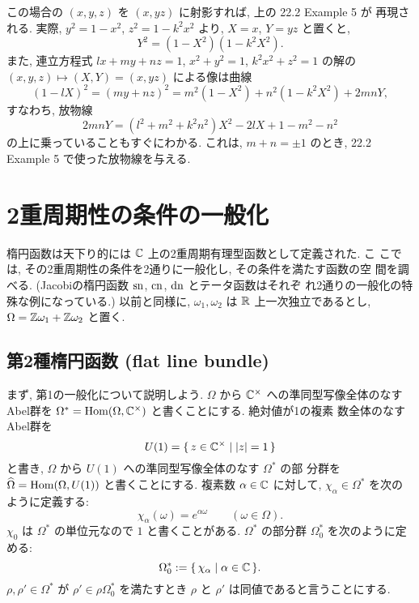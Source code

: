 \documentclass[12pt,twoside]{jarticle}
\def\sn{\mathop{\text{\rm sn}}\nolimits}
\def\cn{\mathop{\text{\rm cn}}\nolimits}
\def\dn{\mathop{\text{\rm dn}}\nolimits}
\def\Omegahat{\widehat\Omega}
\def\Hom{\mathop{\text{\rm Hom}}\nolimits}
\def\Z{{\Bbb Z}} %
\def\R{{\Bbb R}} %
\def\C{{\Bbb C}} %
\begin{document}
この場合の $(x,y,z)$ を $(x,yz)$ に射影すれば, 上の 22.2 Example 5 が
再現される.  実際, $y^2 = 1 - x^2$, $z^2 = 1 - k^2 x^2$ より, %
$X = x$, $Y = yz$ と置くと,
\[
  Y^2 = (1 - X^2)(1 - k^2 X^2).
\] %
また, 連立方程式 $l x + m y + n z = 1$, $x^2 + y^2 = 1$, %
$k^2 x^2 + z^2 = 1$ の解の $(x,y,z)\mapsto(X,Y)=(x,yz)$ による像は曲線
\[
  (1 - lX)^2 = (my + nz)^2 = m^2(1 - X^2) + n^2(1 - k^2 X^2) + 2mnY,
\]
すなわち, 放物線
\[
  2mnY = (l^2 + m^2 + k^2 n^2) X^2 - 2 l X + 1 - m^2 - n^2
\] %
の上に乗っていることもすぐにわかる. これは, $m + n = \pm1$ のとき, %
\cite{WW} 22.2 Example 5 で使った放物線を与える.


\section{2重周期性の条件の一般化}

楕円函数は天下り的には $\C$ 上の2重周期有理型函数として定義された. こ
こでは, その2重周期性の条件を2通りに一般化し, その条件を満たす函数の空
間を調べる. (Jacobiの楕円函数 $\sn$, $\cn$, $\dn$ とテータ函数はそれぞ
れ2通りの一般化の特殊な例になっている.)  
以前と同様に, $\omega_1,\omega_2$ は $\R$ 上一次独立であるとし, %
$\Omega=\Z\omega_1+\Z\omega_2$ と置く.


\subsection{第2種楕円函数 (flat line bundle)}

まず, 第1の一般化について説明しよう. %
$\Omega$ から $\C^{\times}$ への準同型写像全体のなすAbel群を %
$\Omega^*=\Hom(\Omega,\C^{\times})$ と書くことにする. 絶対値が1の複素
数全体のなすAbel群を
\[
  U(1)=\{\,z\in\C^{\times}\mid|z|=1\,\}
\] %
と書き, $\Omega$ から $U(1)$ への準同型写像全体のなす $\Omega^*$ の部
分群を $\Omegahat=\Hom(\Omega,U(1))$ と書くことにする. %
複素数 $\alpha\in\C$ に対して, %
$\chi_\alpha\in\Omega^*$ を次のように定義する:
\[
  \chi_\alpha(\omega)=e^{\alpha\omega}
  \qquad
  (\omega\in\Omega).
\] %
$\chi_0$ は $\Omega^*$ の単位元なので $1$ と書くことがある. %
$\Omega^*$ の部分群 $\Omega^*_0$ を次のように定める:
\[
  \Omega^*_0 := \{\,\chi_\alpha \mid \alpha\in\C \,\}.
\] %
$\rho,\rho'\in\Omega^*$ が $\rho'\in\rho\Omega^*_0$ を満たすとき %
$\rho$ と $\rho'$ は同値であると言うことにする.
\end{document}
